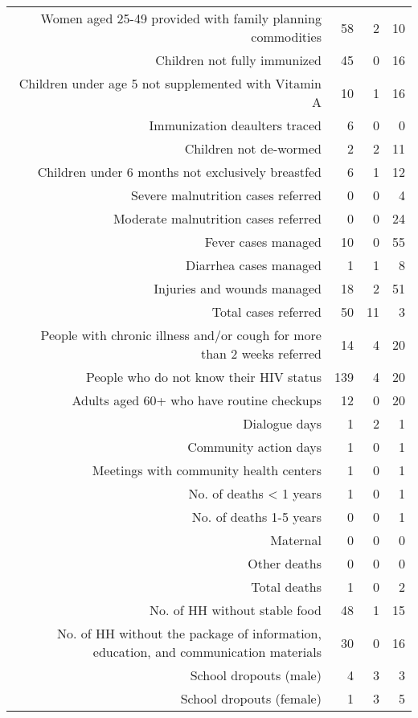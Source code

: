 \begin{adjustbox}{width=\textwidth, totalheight=\textheight,keepaspectratio}
\begin{table}[htbp]
\begin{tabular}{rrrr}
    Women aged 25-49 provided with family planning commodities & 58    & 2     & 10 \\
    Children not fully immunized & 45    & 0     & 16 \\
    Children under age 5 not supplemented with Vitamin A & 10    & 1     & 16 \\
    Immunization deaulters traced & 6     & 0     & 0 \\
    Children not de-wormed & 2     & 2     & 11 \\
    Children under 6 months not exclusively breastfed & 6     & 1     & 12 \\
    Severe malnutrition cases referred & 0     & 0     & 4 \\
    Moderate malnutrition cases referred & 0     & 0     & 24 \\
    Fever cases managed & 10    & 0     & 55 \\
    Diarrhea cases managed & 1     & 1     & 8 \\
    Injuries and wounds managed & 18    & 2     & 51 \\
    Total cases referred & 50    & 11    & 3 \\
    People with chronic illness and/or cough for more than 2 weeks referred & 14    & 4     & 20 \\
    People who do not know their HIV status & 139   & 4     & 20 \\
    Adults aged 60+ who have routine checkups & 12    & 0     & 20 \\
    Dialogue days & 1     & 2     & 1 \\
    Community action days & 1     & 0     & 1 \\
    Meetings with community health centers & 1     & 0     & 1 \\
    No. of deaths < 1 years & 1     & 0     & 1 \\
    No. of deaths 1-5 years & 0     & 0     & 1 \\
    Maternal & 0     & 0     & 0 \\
    Other deaths & 0     & 0     & 0 \\
    Total deaths & 1     & 0     & 2 \\
    No. of HH without stable food & 48    & 1     & 15 \\
    No. of HH without the package of information, education, and communication materials & 30    & 0     & 16 \\
    School dropouts (male) & 4     & 3     & 3 \\
    School dropouts (female) & 1     & 3     & 5 \\
    \bottomrule
    \end{tabular}%
  \label{tab:addlabel}%
\end{table}%
\end{adjustbox}
